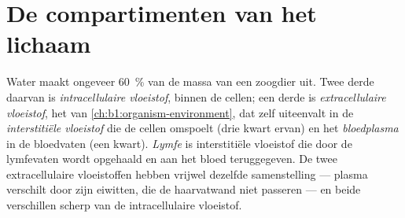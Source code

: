 \section{De compartimenten van het lichaam}

\begin{definition}[Vloeistofcompartimenten]\label{def:b1:mammal-organization:compartments}
Water maakt ongeveer \qty{60}{\%} van de massa van een zoogdier uit. Twee derde
daarvan is \emph{intracellulaire vloeistof},
binnen de cellen; een derde is
\emph{extracellulaire vloeistof}, het  van \cref{ch:b1:organism-environment}, dat zelf uiteenvalt in de
\emph{interstitiële vloeistof} die de cellen
omspoelt (drie kwart ervan) en het \emph{bloedplasma} in de bloedvaten
(een kwart). \emph{Lymfe} is interstitiële vloeistof die door de
lymfevaten wordt opgehaald en aan het bloed teruggegeven. De twee
extracellulaire vloeistoffen hebben vrijwel dezelfde samenstelling --- plasma
verschilt door zijn eiwitten, die de haarvatwand niet passeren --- en beide
verschillen scherp van de intracellulaire vloeistof.
\end{definition}

